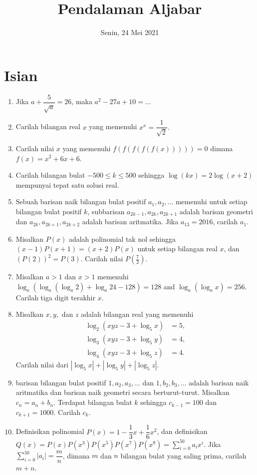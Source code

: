 \documentclass{article}
\title{Pendalaman Aljabar}
\author{}
\date{Senin, 24 Mei 2021}
\begin{document}
	\maketitle
	
	\section{Isian}
	\begin{enumerate}
		\item Jika $a+\dfrac{5}{\sqrt{a}}=26$, maka  $a^2-27a+10=...$
		
		\item Carilah bilangan real $x$ yang memenuhi $x^x = \dfrac{1}{\sqrt{2}}.$
		
		\item Carilah nilai $x$ yang memenuhi $f(f(f(f(f(x)))))=0$ dimana $f(x)=x^2+6x+6$.
		
		\item Carilah bilangan bulat $-500\le k \le 500$ sehingga $\log(kx)=2\log(x+2)$ mempunyai tepat satu solusi real.
		
		\item Sebuah barisan naik bilangan bulat positif $a_1, a_2, \dots$ memenuhi untuk setiap bilangan bulat positif $k$, subbarisan $a_{2k-1},a_{2k},a_{2k+1}$ adalah barisan geometri dan $a_{2k},a_{2k+1},a_{2k+2}$ adalah barisan aritmatika. Jika $a_{13}=2016$, carilah $a_1$.
		
		\item Misalkan $P(x)$ adalah polinomial tak nol sehingga $(x-1)P(x+1)=(x+2)P(x)$ untuk setiap bilangan real $x$, dan $(P(2))^2 = P(3)$. Carilah nilai $P(\frac{7}{2})$.
		
		\item Misalkan $a > 1$ dan $x > 1$ memenuhi $\log_a(\log_a(\log_a 2) + \log_a 24 - 128) = 128$ and $\log_a(\log_a x) = 256$. Carilah tiga digit terakhir $x$.
		
		\item Misalkan $x,y,$ dan $z$ adalah bilangan real yang memenuhi
		\begin{align*} \log_2(xyz-3+\log_5 x)&=5,\\ \log_3(xyz-3+\log_5 y)&=4,\\ \log_4(xyz-3+\log_5 z)&=4. 
		\end{align*}Carilah nilai dari $|\log_5 x|+|\log_5 y|+|\log_5 z|$.
	
		\item barisan bilangan bulat positif $1,a_2, a_3,...$ dan $1,b_2, b_3,...$ adalah barisan naik aritmatika dan barisan naik geometri secara berturut-turut. Misalkan $c_n=a_n+b_n$. Terdapat bilangan bulat $k$ sehingga $c_{k-1}=100$ dan $c_{k+1}=1000$. Carilah $c_k$.
		
		\item Definisikan polinomial $P(x)=1-\dfrac{1}{3}x+\dfrac{1}{6}x^{2}$, dan definisikan $Q(x)=P(x)P(x^{3})P(x^{5})P(x^{7})P(x^{9})=\sum_{i=0}^{50} a_ix^{i}$. Jika $\sum_{i=0}^{50} |a_i|=\dfrac{m}{n}$, dimana $m$ dan $n$ bilangan bulat yang saling prima, carilah $m+n$.
	\end{enumerate}
\end{document}
